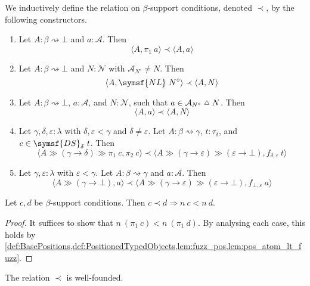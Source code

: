 \begin{definition}
    \label{def:Constrains}
    We inductively define the  relation on \( \beta \)-support conditions, denoted \( \prec \), by the following constructors.
    \begin{enumerate}
        \item Let \( A : \beta \rightsquigarrow \bot \) and \( a : \mathcal A \).
        Then
        \[ \langle A, \pi_1\ a \rangle \prec \langle A, a \rangle \]
        \item Let \( A : \beta \rightsquigarrow \bot \) and \( N : \mathcal N \) with \( \mathcal A_{N^\circ} \neq N \).
        Then
        \[ \langle A, \symsf{NL}\ N^\circ \rangle \prec \langle A, N \rangle \]
        \item Let \( A : \beta \rightsquigarrow \bot \), \( a : \mathcal A \), and \( N : \mathcal N \), such that \( a \in \mathcal A_{N^\circ} \symmdiff N \).
        Then
        \[ \langle A, a \rangle \prec \langle A, N \rangle \]
        \item Let \( \gamma, \delta, \varepsilon : \lambda \) with \( \delta, \varepsilon < \gamma \) and \( \delta \neq \varepsilon \).
        Let \( A : \beta \rightsquigarrow \gamma \), \( t : \tau_\delta \), and \( c \in \symsf{DS}_\delta\ t \).
        Then
        \[ \langle A \gg (\gamma \to \delta) \gg \pi_1\ c, \pi_2\ c \rangle \prec \langle A \gg (\gamma \to \varepsilon) \gg (\varepsilon \to \bot), f_{\delta, \varepsilon}\ t \rangle \]
        \item Let \( \gamma, \varepsilon : \lambda \) with \( \varepsilon < \gamma \).
        Let \( A : \beta \rightsquigarrow \gamma \) and \( a : \mathcal A \).
        Then
        \[ \langle A \gg (\gamma \to \bot), a \rangle \prec \langle A \gg (\gamma \to \varepsilon) \gg (\varepsilon \to \bot), f_{\bot, \varepsilon}\ a \rangle \]
    \end{enumerate}
\end{definition}
\begin{lemma}
    Let \( c, d \) be \( \beta \)-support conditions.
    Then \( c \prec d \Rightarrow n\ c < n\ d \).
\end{lemma}
\begin{proof}
    It suffices to show that \( n\ (\pi_1\ c) < n\ (\pi_1\ d) \).
    By analysing each case, this holds by \cref{def:BasePositions,def:PositionedTypedObjects,lem:fuzz_pos,lem:pos_atom_lt_fuzz}.
\end{proof}
\begin{lemma}
    The relation \( \prec \) is well-founded.
\end{lemma}
